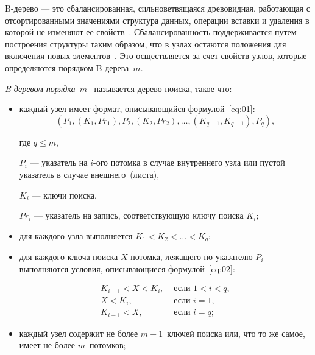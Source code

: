 B-дерево --- это сбалансированная, сильноветвящаяся древовидная, работающая с
отсортированными значениями структура данных, операции вставки и удаления в
которой не изменяют ее свойств~\cite{loshad}. Сбалансированность поддерживается
путем построения структуры таким образом, что в узлах остаются положения для
включения новых элементов~\cite{baw}. Это осществляется за счет
свойств узлов, которые определяются порядком B-дерева~$m$.

\textit{B-деревом порядка~$m$}~\cite{baw, arki} называется дерево поиска,
такое что:

\begin{itemize}
    \item каждый узел имеет формат, описывающийся формулой~\ref{eq:01}:
        \begin{equation}\label{eq:01}
            (P_1, (K_1, Pr_1), P_2, (K_2, Pr_2), \dots, (K_{q-1}, K_{q-1}),
            P_q),
        \end{equation}

        где $q \leqslant m$,

        $P_i$ --- указатель на $i$-ого потомка в случае внутреннего узла или
        пустой указатель в случае внешнего~(листа),

        $K_i$ --- ключи поиска,

        $Pr_i$ --- указатель на запись, соответствующую ключу поиска $K_i$;

    \item для каждого узла выполняется $K_1 < K_2 < \dots < K_q$;

    \item для каждого ключа поиска $X$ потомка, лежащего по указателю $P_i$
        выполняются условия, описывающиеся формулой~\ref{eq:02}:

        \begin{equation}\label{eq:02}
            \begin{aligned}
                K_{i-1} < X < K_i, & \text{ если } 1 < i < q,\\
                X < K_i, & \text{ если } i = 1,\\
                K_{i-1} < X, & \text{ если } i = q;
            \end{aligned}
        \end{equation}

    \item каждый узел содержит не более $m - 1$~ключей поиска или, что то же
        самое, имеет не более $m$~потомков;


\end{itemize}

